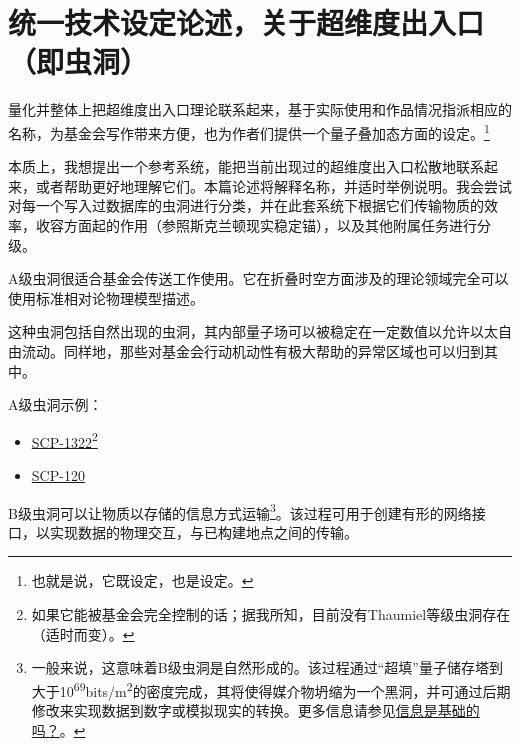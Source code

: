 \section{统一技术设定论述，关于超维度出入口（即虫洞）}

\label{sec:DOC-about.black.hole}




\hr

量化并整体上把超维度出入口理论联系起来，基于实际使用和作品情况指派相应的名称，为基金会写作带来方便，也为作者们提供一个量子叠加态方面的设定。\footnote{也就是说，它既设定，也是设定。}

本质上，我想提出一个参考系统，能把当前出现过的超维度出入口松散地联系起来，或者帮助更好地理解它们。本篇论述将解释名称，并适时举例说明。我会尝试对每一个写入过数据库的虫洞进行分类，并在此套系统下根据它们传输物质的效率，收容方面起的作用（参照斯克兰顿现实稳定锚），以及其他附属任务进行分级。


\hr


A级虫洞很适合基金会传送工作使用。它在折叠时空方面涉及的理论领域完全可以使用标准相对论物理模型描述。

这种虫洞包括自然出现的虫洞，其内部量子场可以被稳定在一定数值以允许以太自由流动。同样地，那些对基金会行动机动性有极大帮助的异常区域也可以归到其中。

A级虫洞示例：

\begin{itemize}
\item \hyperref[chap:SCP-1322]{SCP-1322}\footnote{如果它能被基金会完全控制的话；据我所知，目前没有Thaumiel等级虫洞存在（适时而变）。}
\item \hyperref[chap:SCP-120]{SCP-120}
\end{itemize}


B级虫洞可以让物质以存储的信息方式运输\footnote{一般来说，这意味着B级虫洞是自然形成的。该过程通过“超填”量子储存塔到大于10\textsuperscript{69}bits\slash m\textsuperscript{2}的密度完成，其将使得媒介物坍缩为一个黑洞，并可通过后期修改来实现数据到数字或模拟现实的转换。更多信息请参见\hyperref[chap:]{信息是基础的吗？}。}。该过程可用于创建有形的网络接口，以实现数据的物理交互，与已构建地点之间的传输。

